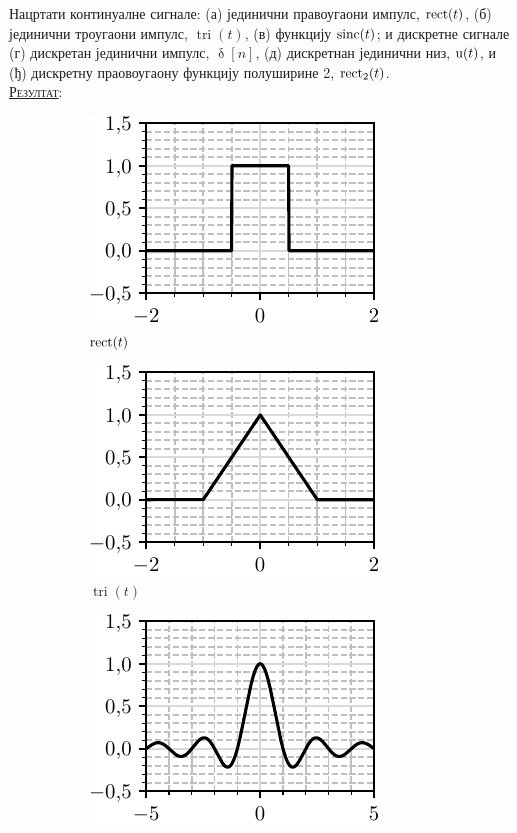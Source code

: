 \PID Нацртати континуалне сигнале:
(а) јединични правоугаони импулс, $\operatorname{rect}(t)$, 
(б) јединични троугаони импулс, $\operatorname{tri}(t)$, 
(в) функцију $\operatorname{sinc}(t)$; и дискретне сигнале 
(г) дискретан јединични импулс, $\updelta[n]$, 
(д) дискретнан јединични низ, ${\rm u}(t)$, и 
(ђ) дискретну праовоугаону функцију полуширине 2, $\operatorname{rect}_2(t)$.
\\[2mm]

\textsc{\underline{Резултат}}:
\begin{figure}[ht!]
    \hspace*{0pt}\hfill
    \begin{subfigure}[c]{0.33\textwidth}
        \centering
        \includegraphics[scale=1]{fig/rect_plot.pdf}
        \caption{$\operatorname{rect}(t)$}
    \end{subfigure}
    \hspace*{0pt}\hfill
    \begin{subfigure}[c]{0.3\textwidth}
        \centering
        \includegraphics[scale=1]{fig/tri_plot.pdf}
        \caption{$\operatorname{tri}(t)$}
    \end{subfigure}
    \hfill
    \hspace*{0pt}
    \hspace*{0pt}\hfill
    \begin{subfigure}[c]{0.3\textwidth}
        \centering
        \includegraphics[scale=1]{fig/sinc_plot.pdf}

\end{subfigure}
\end{figure}
